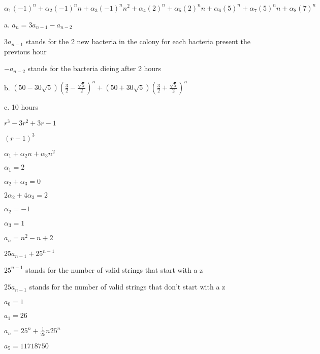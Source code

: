 \documentclass[12pt]{article}
\newenvironment{problem}[2][Problem]{\begin{trivlist}
\item[\hskip \labelsep {\bfseries #1}\hskip \labelsep {\bfseries #2.}]}{\end{trivlist}}
\begin{document}
$\alpha_1(-1)^n + \alpha_2(-1)^nn + \alpha_3(-1)^nn^2 + \alpha_4(2)^n + \alpha_5(2)^nn + \alpha_6(5)^n + \alpha_7(5)^nn + \alpha_8(7)^n$

\begin{problem}{8.supp.4 a,b,c}
\end{problem}

a. $a_n = 3a_{n-1} - a_{n-2}$

$3a_{n-1}$ stands for the 2 new bacteria in the colony for each bacteria present the previous hour

$-a_{n-2}$ stands for the bacteria dieing after 2 hours

b. $(50-30\sqrt{5})(\frac{3}{2}-\frac{\sqrt{5}}{2})^n + (50+30\sqrt{5})(\frac{3}{2}+\frac{\sqrt{5}}{2})^n$

c. 10 hours

\begin{problem}{8.supp.6}
\end{problem}



\begin{problem}{8.supp.12}
\end{problem}

$r^3-3r^2+3r-1$

$(r-1)^3$

$\alpha_1 + \alpha_2 n + \alpha_3 n^2$

$\alpha_1 = 2$

$\alpha_2 + \alpha_3 = 0$

$2\alpha_2+4\alpha_3=2$

$\alpha_2 = -1$

$\alpha_3 = 1$

$a_n = n^2 - n + 2$

\begin{problem}{az strings}
\end{problem}

$25a_{n-1}+25^{n-1}$

$25^{n-1}$ stands for the number of valid strings that start with a z

$25a_{n-1}$ stands for the number of valid strings that don't start with a z

$a_0 = 1$

$a_1 = 26$

$a_n = 25^n + \frac{1}{25}n25^n$

$a_5 = 11718750$
\end{document}
